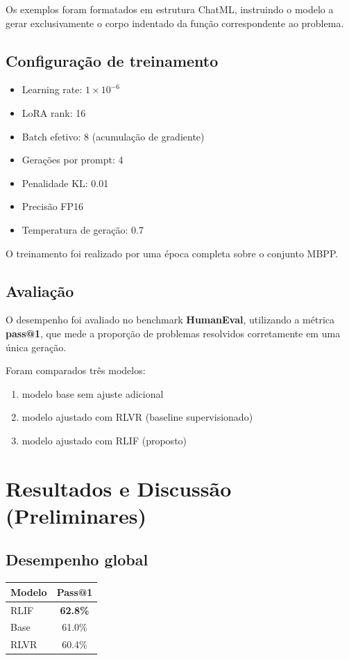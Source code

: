 \documentclass[11pt,a4paper]{article}
\begin{document}
Os exemplos foram formatados em estrutura ChatML, instruindo o modelo a gerar exclusivamente o corpo indentado da função correspondente ao problema.

\subsection{Configuração de treinamento}

\begin{itemize}
\item Learning rate: $1\times10^{-6}$
\item LoRA rank: 16
\item Batch efetivo: 8 (acumulação de gradiente)
\item Gerações por prompt: 4
\item Penalidade KL: 0.01
\item Precisão FP16
\item Temperatura de geração: 0.7
\end{itemize}

O treinamento foi realizado por uma época completa sobre o conjunto MBPP.

\subsection{Avaliação}
O desempenho foi avaliado no benchmark \textbf{HumanEval}, utilizando a métrica \textbf{pass@1}, que mede a proporção de problemas resolvidos corretamente em uma única geração.

Foram comparados três modelos:

\begin{enumerate}
\item modelo base sem ajuste adicional
\item modelo ajustado com RLVR (baseline supervisionado)
\item modelo ajustado com RLIF (proposto)
\end{enumerate}

\section{Resultados e Discussão (Preliminares)}

\subsection{Desempenho global}

\begin{center}
\begin{tabular}{lc}
\hline
Modelo & Pass@1 \\
\hline
RLIF & \textbf{62.8\%} \\
Base & 61.0\% \\
RLVR & 60.4\% \\
\hline
\end{tabular}
\end{center}
\end{document}
